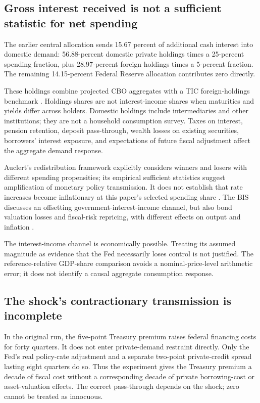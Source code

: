 \documentclass[11pt]{article}
\begin{document}
\subsection*{Gross interest received is not a sufficient statistic for net spending}

The earlier central allocation sends 15.67 percent of additional cash interest into
domestic demand: 56.88-percent domestic private holdings times a 25-percent spending
fraction, plus 28.97-percent foreign holdings times a 5-percent fraction. The remaining
14.15-percent Federal Reserve allocation contributes zero directly.

These holdings combine projected CBO aggregates with a TIC foreign-holdings benchmark
\cite{tic}. Holdings shares are not interest-income shares when maturities and yields
differ across holders. Domestic holdings include intermediaries and other institutions;
they are not a household consumption survey. Taxes on interest, pension retention,
deposit pass-through, wealth losses on existing securities, borrowers' interest exposure,
and expectations of future fiscal adjustment affect the aggregate demand response.

Auclert's redistribution framework explicitly considers winners and losers with different
spending propensities; its empirical sufficient statistics suggest amplification of monetary
policy transmission. It does not establish that rate increases become inflationary at
this paper's selected spending share \cite{auclert}. The BIS discusses an offsetting
government-interest-income channel, but also bond valuation losses and fiscal-risk
repricing, with different effects on output and inflation \cite{bisDebt2026}.

The interest-income channel is economically possible. Treating its assumed magnitude as
evidence that the Fed necessarily loses control is not justified. The reference-relative
GDP-share comparison avoids a nominal-price-level arithmetic error; it does not identify
a causal aggregate consumption response.

\subsection*{The shock's contractionary transmission is incomplete}

In the original run, the five-point Treasury premium raises federal financing costs for
forty quarters. It does not enter private-demand restraint directly. Only the Fed's
real policy-rate adjustment and a separate two-point private-credit spread lasting eight
quarters do so. Thus the experiment gives the Treasury premium a decade of fiscal cost
without a corresponding decade of private borrowing-cost or asset-valuation effects.
The correct pass-through depends on the shock; zero cannot be treated as innocuous.
\end{document}
